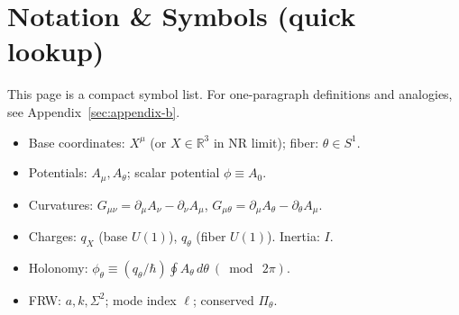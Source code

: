 \section{Notation \& Symbols (quick lookup)}\label{sec:notation}
\noindent This page is a compact symbol list. For one-paragraph definitions and analogies, see Appendix~\ref{sec:appendix-b}.
\begin{itemize}
  \item Base coordinates: $X^\mu$ (or $X\in\mathbb R^3$ in NR limit); fiber: $\theta\in S^1$.
  \item Potentials: $A_\mu, A_\theta$; scalar potential $\phi\equiv A_0$.
  \item Curvatures: $G_{\mu\nu}=\partial_\mu A_\nu-\partial_\nu A_\mu$, $G_{\mu\theta}=\partial_\mu A_\theta-\partial_\theta A_\mu$.
  \item Charges: $q_X$ (base $U(1)$), $q_\theta$ (fiber $U(1)$). Inertia: $I$.
  \item Holonomy: $\phi_\theta\equiv( q_\theta/\hbar)\oint A_\theta\,d\theta\ (\bmod\ 2\pi)$.
  \item FRW: $a,k,\Sigma^2$; mode index $\ell$; conserved $\Pi_\theta$.
\end{itemize}
